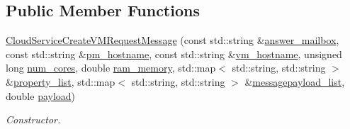 \subsection*{Public Member Functions}
\begin{DoxyCompactItemize}
\item 
\hyperlink{classwrench_1_1_cloud_service_create_v_m_request_message_af1429cfb426e6db09c82fff0d5f68a19}{Cloud\+Service\+Create\+V\+M\+Request\+Message} (const std\+::string \&\hyperlink{classwrench_1_1_cloud_service_create_v_m_request_message_affcbf37ecbf136a1ba61d6ea549f8092}{answer\+\_\+mailbox}, const std\+::string \&\hyperlink{classwrench_1_1_cloud_service_create_v_m_request_message_a68d03a3acf63eb06fead5ea1f6ed4012}{pm\+\_\+hostname}, const std\+::string \&\hyperlink{classwrench_1_1_cloud_service_create_v_m_request_message_ad4fb06a93a8ceb82ababe1f342b2d701}{vm\+\_\+hostname}, unsigned long \hyperlink{classwrench_1_1_cloud_service_create_v_m_request_message_a56988853b753fa8fbe8af5dc9b1a328e}{num\+\_\+cores}, double \hyperlink{classwrench_1_1_cloud_service_create_v_m_request_message_a40ea0674867b318fef39a8ad7f298302}{ram\+\_\+memory}, std\+::map$<$ std\+::string, std\+::string $>$ \&\hyperlink{classwrench_1_1_cloud_service_create_v_m_request_message_a2641553429dc07a8162972e44972e755}{property\+\_\+list}, std\+::map$<$ std\+::string, std\+::string $>$ \&\hyperlink{classwrench_1_1_cloud_service_create_v_m_request_message_a571588cf2545a317a36452f1c8599e3a}{messagepayload\+\_\+list}, double \hyperlink{classwrench_1_1_simulation_message_a914f2732713f7c02898e66f05a7cb8a1}{payload})
\begin{DoxyCompactList}\small\item\em Constructor. \end{DoxyCompactList}\end{DoxyCompactItemize}
